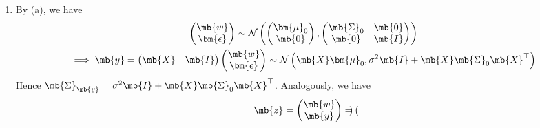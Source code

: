 \begin{exercise}
\begin{enumerate}
\begin{solution}
\begin{enumerate}
                    \item By (a), we have
                        \begin{gather*}
                            \begin{pmatrix}
                                \mb{w} \\
                                \bm{\epsilon}
                            \end{pmatrix}
                            \sim \mathcal{N}\left(
                            \begin{pmatrix}
                                    \bm{\mu}_0 \\
                                    \mb{0}
                                \end{pmatrix},
                            \begin{pmatrix}
                                    \mb{\Sigma}_0 & \mb{0} \\
                                    \mb{0}        & \mb{I}
                                \end{pmatrix}
                            \right)\\
                            \implies
                            \mb{y} = 
                            \begin{pmatrix}
                                \mb{X} & \mb{I}
                            \end{pmatrix}
                            \begin{pmatrix}
                                \mb{w} \\
                                \bm{\epsilon}
                            \end{pmatrix}
                            \sim \mathcal{N}\left(\mb{X}\bm{\mu}_0, \sigma^2\mb{I}+\mb{X}\mb{\Sigma}_0\mb{X}^\top\right)
                        \end{gather*}
                        Hence $\mb{\Sigma}_\mb{y}=\sigma^2\mb{I}+\mb{X}\mb{\Sigma}_0\mb{X}^\top$. Analogously, we have
                        \begin{gather*}
                            \mb{z}=
                            \begin{pmatrix}
                                \mb{w} \\
                                \mb{y}
                            \end{pmatrix}
                            = 
                            \begin{pmatrix}

\end{pmatrix}
\end{gather*}
\end{enumerate}
\end{solution}
\end{enumerate}
\end{exercise}
